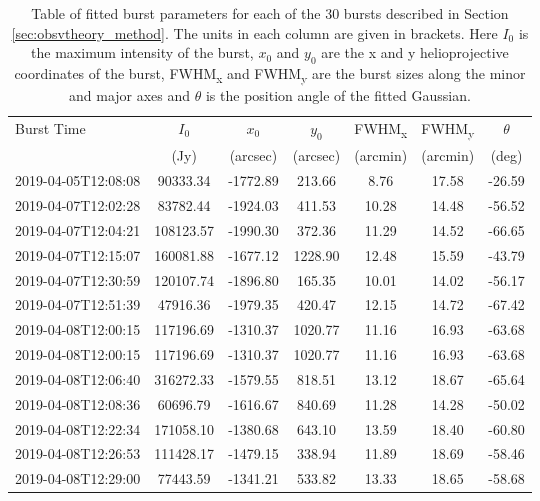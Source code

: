 \begin{table}
\centering
\caption[Table of fitted burst parameters]{Table of fitted burst parameters for each of the 30 bursts described in Section \ref{sec:obsvtheory_method}. The units in each column are given in brackets. Here $I_0$ is the maximum intensity of the burst, $x_0$ and $y_0$ are the x and y helioprojective coordinates of the burst, FWHM\textsubscript{x} and FWHM\textsubscript{y} are the burst sizes along the minor and major axes and $\theta$ is the position angle of the fitted Gaussian.}
\label{tab:dataset}
\begin{tabular}{lcccccc}
\toprule
Burst Time & $I_0$  & $x_0$ & $y_0$  & FWHM\textsubscript{x} & FWHM\textsubscript{y} & $\theta$ \\
 & (Jy) & (arcsec) & (arcsec) & (arcmin) & (arcmin) &  (deg) \\
\midrule
2019-04-05T12:08:08 &   90333.34 & -1772.89 &   213.66 &    8.76 &   17.58 &  -26.59 \\
2019-04-07T12:02:28 &   83782.44 & -1924.03 &   411.53 &   10.28 &   14.48 &  -56.52 \\
2019-04-07T12:04:21 &  108123.57 & -1990.30 &   372.36 &   11.29 &   14.52 &  -66.65 \\
2019-04-07T12:15:07 &  160081.88 & -1677.12 &  1228.90 &   12.48 &   15.59 &  -43.79 \\
2019-04-07T12:30:59 &  120107.74 & -1896.80 &   165.35 &   10.01 &   14.02 &  -56.17 \\
2019-04-07T12:51:39 &   47916.36 & -1979.35 &   420.47 &   12.15 &   14.72 &  -67.42 \\
2019-04-08T12:00:15 &  117196.69 & -1310.37 &  1020.77 &   11.16 &   16.93 &  -63.68 \\
2019-04-08T12:00:15 &  117196.69 & -1310.37 &  1020.77 &   11.16 &   16.93 &  -63.68 \\
2019-04-08T12:06:40 &  316272.33 & -1579.55 &   818.51 &   13.12 &   18.67 &  -65.64 \\
2019-04-08T12:08:36 &   60696.79 & -1616.67 &   840.69 &   11.28 &   14.28 &  -50.02 \\
2019-04-08T12:22:34 &  171058.10 & -1380.68 &   643.10 &   13.59 &   18.40 &  -60.80 \\
2019-04-08T12:26:53 &  111428.17 & -1479.15 &   338.94 &   11.89 &   18.69 &  -58.46 \\
2019-04-08T12:29:00 &   77443.59 & -1341.21 &   533.82 &   13.33 &   18.65 &  -58.68 \\

\end{tabular}
\end{table}

